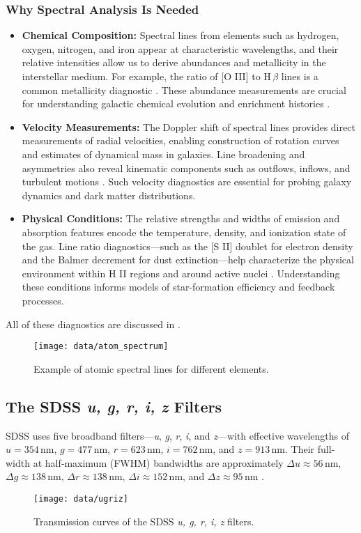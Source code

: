 \documentclass[english,bachelor,oneside]{ctufit-thesis}
\begin{document}
\subsubsection{Why Spectral Analysis Is Needed}
\begin{itemize}
    \item \textbf{Chemical Composition:} Spectral lines from elements such as hydrogen, oxygen, nitrogen, and iron appear at characteristic wavelengths, and their relative intensities allow us to derive abundances and metallicity in the interstellar medium. For example, the ratio of [O III] to H\,$\beta$ lines is a common metallicity diagnostic \cite{Osterbrock2006}. These abundance measurements are crucial for understanding galactic chemical evolution and enrichment histories \cite{tennyson2019astronomical}.
    \item \textbf{Velocity Measurements:} The Doppler shift of spectral lines provides direct measurements of radial velocities, enabling construction of rotation curves and estimates of dynamical mass in galaxies. Line broadening and asymmetries also reveal kinematic components such as outflows, inflows, and turbulent motions \cite{Osterbrock2006}. Such velocity diagnostics are essential for probing galaxy dynamics and dark matter distributions.
    \item \textbf{Physical Conditions:} The relative strengths and widths of emission and absorption features encode the temperature, density, and ionization state of the gas. Line ratio diagnostics—such as the [S II] doublet for electron density and the Balmer decrement for dust extinction—help characterize the physical environment within H II regions and around active nuclei \cite{tennyson2019astronomical}. Understanding these conditions informs models of star-formation efficiency and feedback processes.
\end{itemize}
All of these diagnostics are discussed in \cite[p.~1–6]{tennyson2019astronomical}.


\begin{figure}[H]
    \centering
    \texttt{[image: data/atom\_spectrum]}
    \caption{Example of atomic spectral lines for different elements.\cite{Spectros98:online}}
    \label{fig:atom_spectrum}
\end{figure}

\subsection{The SDSS \textit{u, g, r, i, z} Filters}
SDSS uses five broadband filters—\textit{u}, \textit{g}, \textit{r}, \textit{i}, and \textit{z}—with effective wavelengths of 
$u = 354\,$nm, $g = 477\,$nm, $r = 623\,$nm, $i = 762\,$nm, and $z = 913\,$nm.  
Their full‐width at half‐maximum (FWHM) bandwidths are approximately  
$\Delta u \approx 56\,$nm, $\Delta g \approx 138\,$nm, $\Delta r \approx 138\,$nm,  
$\Delta i \approx 152\,$nm, and $\Delta z \approx 95\,$nm \cite{fukugita1996sloan}.  
\begin{figure}[H]
    \centering
    \texttt{[image: data/ugriz]}
    \caption{Transmission curves of the SDSS \textit{u, g, r, i, z} filters.}
    \label{fig:ugriz}
\end{figure}
\end{document}
